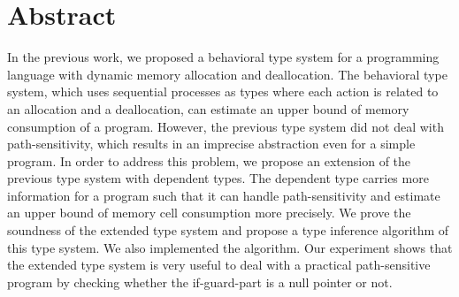 \section{Abstract}
\label{sec:abstraction}
In the previous work, we proposed a behavioral type system for a
programming language with dynamic memory allocation and deallocation.
The behavioral type system, which uses sequential processes as types
where each action is related to an allocation and a deallocation, can
estimate an upper bound of memory consumption of a program.  However,
the previous type system did not deal with path-sensitivity, which
results in an imprecise abstraction even for a simple program.  In
order to address this problem, we propose an extension of the previous
type system with dependent types.  The dependent type carries more
information for a program such that it can handle path-sensitivity and
estimate an upper bound of memory cell consumption more precisely.  We
prove the soundness of the extended type system and propose a type
inference algorithm of this type system.  We also implemented the
algorithm.  Our experiment shows that the extended type system is very
useful to deal with a practical path-sensitive program by checking
whether the if-guard-part is a null pointer or not.


